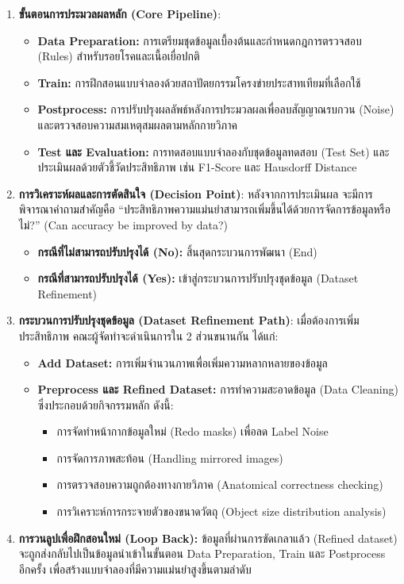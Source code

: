 \begin{enumerate}
    \item \textbf{ขั้นตอนการประมวลผลหลัก (Core Pipeline)}:
    \begin{itemize}
        \item \textbf{Data Preparation:} การเตรียมชุดข้อมูลเบื้องต้นและกำหนดกฎการตรวจสอบ (Rules) สำหรับรอยโรคและเนื้อเยื่อปกติ
        \item \textbf{Train:} การฝึกสอนแบบจำลองด้วยสถาปัตยกรรมโครงข่ายประสาทเทียมที่เลือกใช้
        \item \textbf{Postprocess:} การปรับปรุงผลลัพธ์หลังการประมวลผลเพื่อลบสัญญาณรบกวน (Noise) และตรวจสอบความสมเหตุสมผลตามหลักกายวิภาค
        \item \textbf{Test และ Evaluation:} การทดสอบแบบจำลองกับชุดข้อมูลทดสอบ (Test Set) และประเมินผลด้วยตัวชี้วัดประสิทธิภาพ เช่น F1-Score และ Hausdorff Distance
    \end{itemize}

    \item \textbf{การวิเคราะห์ผลและการตัดสินใจ (Decision Point)}:
    หลังจากการประเมินผล จะมีการพิจารณาคำถามสำคัญคือ ``ประสิทธิภาพความแม่นยำสามารถเพิ่มขึ้นได้ด้วยการจัดการข้อมูลหรือไม่?'' (Can accuracy be improved by data?)
    \begin{itemize}
        \item \textbf{กรณีที่ไม่สามารถปรับปรุงได้ (No):} สิ้นสุดกระบวนการพัฒนา (End)
        \item \textbf{กรณีที่สามารถปรับปรุงได้ (Yes):} เข้าสู่กระบวนการปรับปรุงชุดข้อมูล (Dataset Refinement)
    \end{itemize}

    \item \textbf{กระบวนการปรับปรุงชุดข้อมูล (Dataset Refinement Path)}:
    เมื่อต้องการเพิ่มประสิทธิภาพ คณะผู้จัดทำจะดำเนินการใน 2 ส่วนขนานกัน ได้แก่:
    \begin{itemize}
        \item \textbf{Add Dataset:} การเพิ่มจำนวนภาพเพื่อเพิ่มความหลากหลายของข้อมูล
        \item \textbf{Preprocess และ Refined Dataset:} การทำความสะอาดข้อมูล (Data Cleaning) ซึ่งประกอบด้วยกิจกรรมหลัก ดังนี้:
        \begin{itemize}
            \item การจัดทำหน้ากากข้อมูลใหม่ (Redo masks) เพื่อลด Label Noise
            \item การจัดการภาพสะท้อน (Handling mirrored images)
            \item การตรวจสอบความถูกต้องทางกายวิภาค (Anatomical correctness checking)
            \item การวิเคราะห์การกระจายตัวของขนาดวัตถุ (Object size distribution analysis)
        \end{itemize}
    \end{itemize}

    \item \textbf{การวนลูปเพื่อฝึกสอนใหม่ (Loop Back):} ข้อมูลที่ผ่านการขัดเกลาแล้ว (Refined dataset) จะถูกส่งกลับไปเป็นข้อมูลนำเข้าในขั้นตอน Data Preparation, Train และ Postprocess อีกครั้ง เพื่อสร้างแบบจำลองที่มีความแม่นยำสูงขึ้นตามลำดับ
\end{enumerate}




